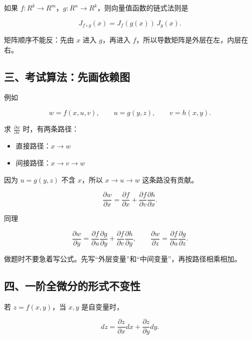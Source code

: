 如果 \(f:R^k\to R^m\)，\(g:R^n\to R^k\)，则向量值函数的链式法则是

\[
      J_{f\circ g}(x)=J_f(g(x))\,J_g(x).
    \]

\begin{notebox}
矩阵顺序不能反：先由 \(x\) 进入 \(g\)，再进入 \(f\)，所以导数矩阵是外层在左，内层在右。
\end{notebox}

\subsection*{三、考试算法：先画依赖图}

例如

\[
      w=f(x,u,v),\qquad u=g(y,z),\qquad v=h(x,y).
    \]

求 \(\frac{\partial w}{\partial x}\) 时，有两条路径：

\begin{itemize}
 \item 直接路径：\(x\to w\)
 \item 间接路径：\(x\to v\to w\)
 \end{itemize}

因为 \(u=g(y,z)\) 不含 \(x\)，所以 \(x\to u\to w\) 这条路没有贡献。

\[
      \frac{\partial w}{\partial x}
      =
      \frac{\partial f}{\partial x}
      +
      \frac{\partial f}{\partial v}
      \frac{\partial h}{\partial x}.
    \]

同理

\[
      \frac{\partial w}{\partial y}
      =
      \frac{\partial f}{\partial u}
      \frac{\partial g}{\partial y}
      +
      \frac{\partial f}{\partial v}
      \frac{\partial h}{\partial y},
      \qquad
      \frac{\partial w}{\partial z}
      =
      \frac{\partial f}{\partial u}
      \frac{\partial g}{\partial z}.
    \]

\begin{notebox}
做题时不要急着写公式。先写“外层变量”和“中间变量”，再按路径相乘相加。
\end{notebox}

\subsection*{四、一阶全微分的形式不变性}

若 \(z=f(x,y)\)，当 \(x,y\) 是自变量时，

\[
      dz=
      \frac{\partial z}{\partial x}dx+
      \frac{\partial z}{\partial y}dy.
    \]

